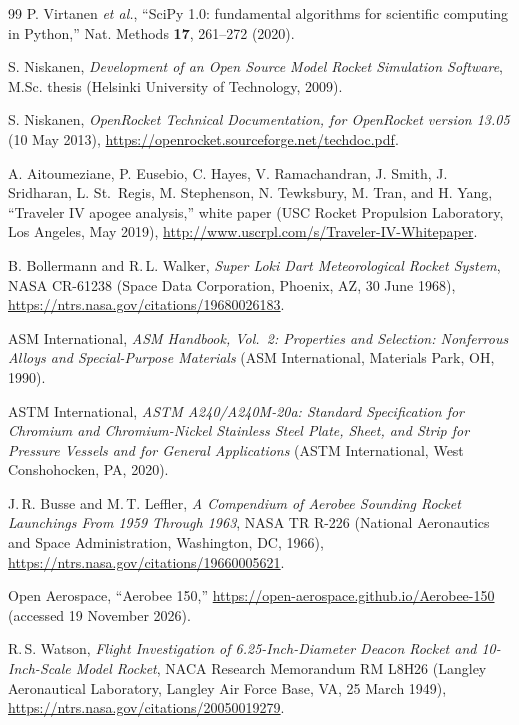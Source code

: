 \documentclass[11pt,a4paper]{article}
\begin{document}
\begin{thebibliography}{99}
 P. Virtanen \emph{et al.}, ``SciPy 1.0: fundamental algorithms for scientific computing in Python,'' Nat. Methods \textbf{17}, 261--272 (2020).

 S. Niskanen, \emph{Development of an Open Source Model Rocket Simulation Software}, M.Sc. thesis (Helsinki University of Technology, 2009).

 S. Niskanen, \emph{OpenRocket Technical Documentation, for OpenRocket version 13.05} (10 May 2013), \url{https://openrocket.sourceforge.net/techdoc.pdf}.

 A. Aitoumeziane, P. Eusebio, C. Hayes, V. Ramachandran, J. Smith, J. Sridharan, L. St.~Regis, M. Stephenson, N. Tewksbury, M. Tran, and H. Yang, ``Traveler IV apogee analysis,'' white paper (USC Rocket Propulsion Laboratory, Los Angeles, May 2019), \url{http://www.uscrpl.com/s/Traveler-IV-Whitepaper}.

 B. Bollermann and R.\,L. Walker, \emph{Super Loki Dart Meteorological Rocket System}, NASA CR-61238 (Space Data Corporation, Phoenix, AZ, 30 June 1968), \url{https://ntrs.nasa.gov/citations/19680026183}.

 ASM International, \emph{ASM Handbook, Vol.~2: Properties and Selection: Nonferrous Alloys and Special-Purpose Materials} (ASM International, Materials Park, OH, 1990).

 ASTM International, \emph{ASTM A240/A240M-20a: Standard Specification for Chromium and Chromium-Nickel Stainless Steel Plate, Sheet, and Strip for Pressure Vessels and for General Applications} (ASTM International, West Conshohocken, PA, 2020).

 J.\,R. Busse and M.\,T. Leffler, \emph{A Compendium of Aerobee Sounding Rocket Launchings From 1959 Through 1963}, NASA TR R-226 (National Aeronautics and Space Administration, Washington, DC, 1966), \url{https://ntrs.nasa.gov/citations/19660005621}.

 Open Aerospace, ``Aerobee 150,'' \url{https://open-aerospace.github.io/Aerobee-150} (accessed 19 November 2026).

 R.\,S. Watson, \emph{Flight Investigation of 6.25-Inch-Diameter Deacon Rocket and 10-Inch-Scale Model Rocket}, NACA Research Memorandum RM L8H26 (Langley Aeronautical Laboratory, Langley Air Force Base, VA, 25 March 1949), \url{https://ntrs.nasa.gov/citations/20050019279}.


\end{thebibliography}
\end{document}
